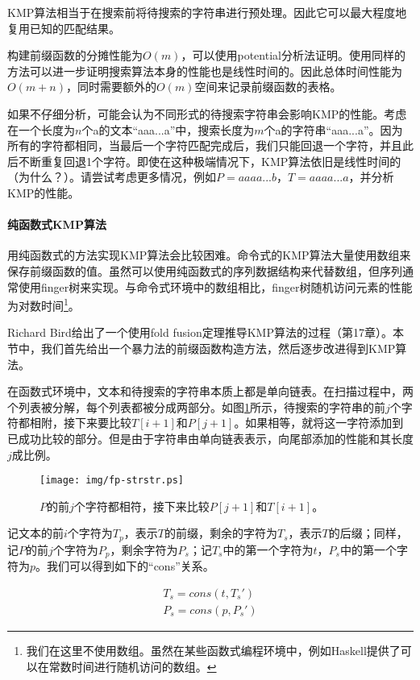 \documentclass[UTF8]{article}
\begin{document}
KMP算法相当于在搜索前将待搜索的字符串进行预处理。因此它可以最大程度地复用已知的匹配结果。

构建前缀函数的分摊性能为$O(m)$，可以使用potential分析法证明\cite{CLRS}。使用同样的方法可以进一步证明搜索算法本身的性能也是线性时间的。因此总体时间性能为$O(m + n)$，同时需要额外的$O(m)$空间来记录前缀函数的表格。

如果不仔细分析，可能会认为不同形式的待搜索字符串会影响KMP的性能。考虑在一个长度为$n$个a的文本“aaa...a”中，搜索长度为$m$个a的字符串“aaa...a”。因为所有的字符都相同，当最后一个字符匹配完成后，我们只能回退一个字符，并且此后不断重复回退1个字符。即使在这种极端情况下，KMP算法依旧是线性时间的（为什么？）。请尝试考虑更多情况，例如$P = aaaa...b$，$T = aaaa...a$，并分析KMP的性能。

\paragraph{纯函数式KMP算法}

用纯函数式的方法实现KMP算法会比较困难。命令式的KMP算法大量使用数组来保存前缀函数的值。虽然可以使用纯函数式的序列数据结构来代替数组，但序列通常使用finger树来实现。与命令式环境中的数组相比，finger树随机访问元素的性能为对数时间\footnote{我们在这里不使用数组。虽然在某些函数式编程环境中，例如Haskell提供了可以在常数时间进行随机访问的数组。}。

Richard Bird给出了一个使用fold fusion定理推导KMP算法的过程（\cite{fp-pearls}第17章）。本节中，我们首先给出一个暴力法的前缀函数构造方法，然后逐步改进得到KMP算法。

在函数式环境中，文本和待搜索的字符串本质上都是单向链表。在扫描过程中，两个列表被分解，每个列表都被分成两部分。如图\ref{fig:fp-strstr}所示，待搜索的字符串的前$j$个字符都相附，接下来要比较$T[i+1]$和$P[j+1]$。如果相等，就将这一字符添加到已成功比较的部分。但是由于字符串由单向链表表示，向尾部添加的性能和其长度$j$成比例。

\begin{figure}[htbp]
 \centering
 \texttt{[image: img/fp-strstr.ps]}
 \caption{$P$的前$j$个字符都相符，接下来比较$P[j+1]$和$T[i+1]$。}
 \label{fig:fp-strstr}
\end{figure}

记文本的前$i$个字符为$T_p$，表示$T$的前缀，剩余的字符为$T_s$，表示$T$的后缀；同样，记$P$的前$j$个字符为$P_p$，剩余字符为$P_s$；记$T_s$中的第一个字符为$t$，$P_s$中的第一个字符为$p$。我们可以得到如下的“cons”关系。

\[
\begin{array}{l}
T_s = cons(t, T_s') \\
P_s = cons(p, P_s')
\end{array}
\]
\end{document}
